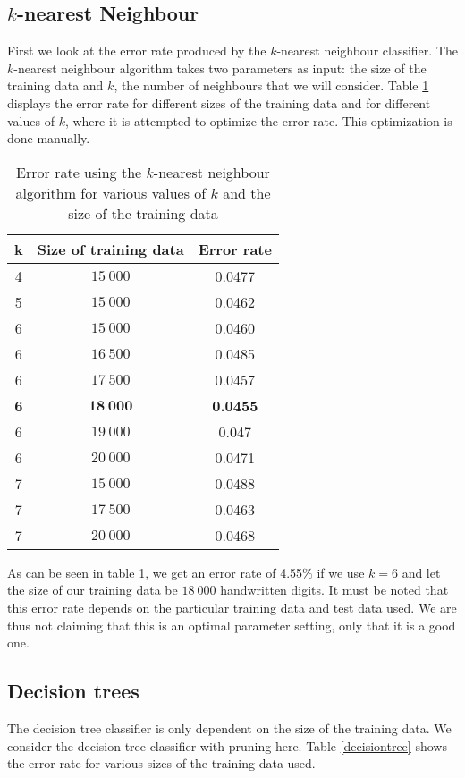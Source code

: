 \documentclass[10pt,a4paper]{article}
\begin{document}
\subsection{$k$-nearest Neighbour}
First we look at the error rate produced by the $k$-nearest neighbour classifier. The $k$-nearest neighbour algorithm takes two parameters as input: the size of the training data and $k$, the number of neighbours that we will consider. Table \ref{knn} displays the error rate for different sizes of the training data and for different values of $k$, where it is attempted to optimize the error rate. This optimization is done manually.

\begin{table}[H]
\begin{tabular}{|c|c|c|}
\hline 
\textbf{k} & \textbf{Size of training data} & \textbf{Error rate} \\ 
\hline 
4 & $15\ 000$ & 0.0477 \\ 
\hline 
5 & $15\ 000$ & 0.0462 \\ 
\hline 
6 & $15\ 000$ & 0.0460 \\ 
\hline 
6 & $16\ 500$ & 0.0485 \\ 
\hline 
6 & $17\ 500$ & 0.0457 \\ 
\hline 
\textbf{6} & $\mathbf{18\ 000}$ & \textbf{0.0455} \\ 
\hline 
6 & $19\ 000$ & 0.047 \\ 
\hline 
6 & $20\ 000$ & 0.0471 \\ 
\hline 
7 & $15\ 000$ & 0.0488 \\ 
\hline 
7 & $17\ 500$ & 0.0463 \\ 
\hline 
7 & $20\ 000$ & 0.0468 \\ 
\hline 
\end{tabular} 
\caption{Error rate using the $k$-nearest neighbour algorithm for various values of $k$ and the size of the training data}
\label{knn}
\end{table}
As can be seen in table \ref{knn}, we get an error rate of 4.55$\%$ if we use $k=6$ and let the size of our training data be $18\ 000$ handwritten digits. It must be noted that this error rate depends on the particular training data and test data used. We are thus not claiming that this is an optimal parameter setting, only that it is a good one.
\subsection{Decision trees}
The decision tree classifier is only dependent on the size of the training data. We consider the decision tree classifier with pruning here. Table \ref{decisiontree} shows the error rate for various sizes of the training data used.
\end{document}

